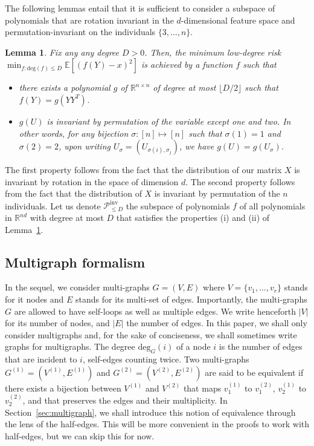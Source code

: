 \documentclass{article}
\newtheorem{lemma}{Lemma}
\begin{document}
The following lemmas entail that it is sufficient to consider a subspace of polynomials that are rotation invariant in the $d$-dimensional feature space  and permutation-invariant on  the individuals $\{3,\ldots, n\}$.
\begin{lemma}\label{lem:reduction:rotation:permutation}
Fix any any degree $D>0$. Then, the minimum low-degree risk  $\min_{f: \mathrm{deg}(f)\leq D}\mathbb{E}[(f(Y)-x)^2]$ is achieved by a function $f$ such that 
\begin{itemize}
    \item[(i)] there exists  a polynomial $g$ of $\mathbb{R}^{n\times n}$ of degree at most $\lfloor D/2\rfloor$ such that $f(Y)= g(YY^T)$.
    \item[(ii)] $g(U)$ is invariant by permutation of the variable except one and two. In other words, for any bijection $\sigma: [n]\mapsto [n]$ such that $\sigma(1)=1$ and $\sigma(2)=2$, upon writing $U_{\sigma}= (U_{\sigma(i),\sigma_{j}})$,   we have $g(U)= g(U_{\sigma})$. 
\end{itemize}
\end{lemma}
The first property follows from the fact that the distribution of our matrix $X$ is invariant by rotation in the space of dimension $d$. The second property follows from the fact that the distribution of $X$ is invariant by permutation of the $n$ individuals. Let us denote $\mathcal{P}^{\mathrm{inv}}_{\leq D}$ the subspace of polynomials $f$ of all polynomials in $\mathbb{R}^{nd}$  with  degree at most $D$  that satisfies the properties (i) and (ii) of Lemma~\ref{lem:reduction:rotation:permutation}. 






\subsection{Multigraph formalism}


In the sequel, we consider multi-graphs $G=(V,E)$ where $V=\{v_1,\ldots, v_r\}$ stands for it nodes and  $E$ stands for its multi-set of edges. Importantly, the multi-graphs $G$ are allowed to have self-loops as well as multiple edges. We write henceforth $|V|$ for its number of nodes, and $|E|$ the number of edges. In this paper, we shall only consider multigraphs and, for the sake of conciseness, we shall sometimes write graphs for multigraphs. 
The degree $\mathrm{deg}_G(i)$ of a node $i$ is the number of edges that are incident to $i$, self-edges counting twice. Two multi-graphs $G^{(1)}=(V^{(1)},E^{(1)})$ and $G^{(2)}=(V^{(2)},E^{(2)})$ are said to be equivalent if there exists a bijection between $V^{(1)}$ and $V^{(2)}$ that maps $v_1^{(1)}$ to $v_1^{(2)}$,  $v_2^{(1)}$ to $v_2^{(2)}$, and  that preserves the edges and their multiplicity. In Section~\ref{sec:multigraph}, we shall introduce this notion of equivalence through the lens of the half-edges. This will be more convenient in the proofs to work with half-edges, but we can skip this for now. 
 
\end{document}
